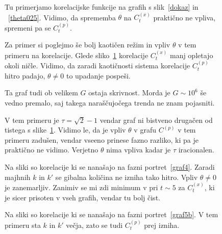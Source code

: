 \documentclass[a4paper, 12pt]{article}
\begin{document}
\begin{figure}[H]\centering
	
	\caption{Tu primerjamo korelacijske funkcije na grafih s slik~\ref{dokaz} in ~\ref{theta025}. Vidimo, da sprememba
		$\theta$ na $C^{(x)}_t$ prakti\v cno ne vpliva, spremeni pa se $C^{(p)}_t$.}
	\label{korelacije}
\end{figure}

\begin{figure}[H]\centering
	
	\caption{Za primer si poglejmo \v se bolj kaoti\v cen re\v zim in vpliv $\theta$ v tem primeru na korelacije.
		Glede sliko~\ref{korelacije} korelacije $C^{(x)}_t$ manj opletajo okoli ni\v cle. Vidimo, da zaradi
		kaoti\v cnosti sistema korelacije $C^{(p)}_t$ hitro padajo, $\theta \neq 0$ to upadanje pospe\v si.}
	\label{korelacije2}
\end{figure}

\begin{figure}[H]\centering
	
	\caption{Ta graf tudi ob velikem $G$ ostaja skrivnost. Morda je $G \sim 10^6$ \v se vedno premalo, saj
		takega nara\v s\v cujo\v cega trenda ne znam pojasniti.}
	\label{korelacije3}
\end{figure}

\begin{figure}[H]\centering
	
	\caption{V tem primeru je $\tau = \sqrt{2}-1$ vendar graf ni bistveno druga\v cen od tistega s slike~\ref{korelacije}.
		Vidimo le, da je vpliv $\theta$ v grafu $C^{(p)}$ v tem primeru zadu\v sen, vendar vseeno prinese fazno
		razliko, ki pa je prakti\v cno ne vidimo. Verjetno $\theta$ nima vpliva kadar je $\tau$ iracionalen.}
	\label{korelacije4}
\end{figure}

\begin{figure}[H]\centering
	
	\caption{Na sliki so korelacije ki se nana\v sajo na fazni portret~\ref{graf4}. Zaradi majhnih $k$ in $k'$ se gibalna
		koli\v cina ne izniha tako hitro. Vpliv $\theta \neq 0$ je zanemarljiv. Zanimiv se mi zdi minimum
		v pri $t \sim 5$ za $C^{(x)}_t$, ki je sicer prisoten v vseh grafih, vendar tu bolj \v cist.}
	\label{n-kor-1}
\end{figure}

\begin{figure}[H]\centering
	
	\caption{Na sliki so korelacije ki se nana\v sajo na fazni portret~\ref{graf5b}.
		V tem primeru sta $k$ in $k'$ ve\v cja, zato se tudi $C^{(p)}_t$ prej izniha.}
	\label{n-kor-2}
\end{figure}
\end{document}
